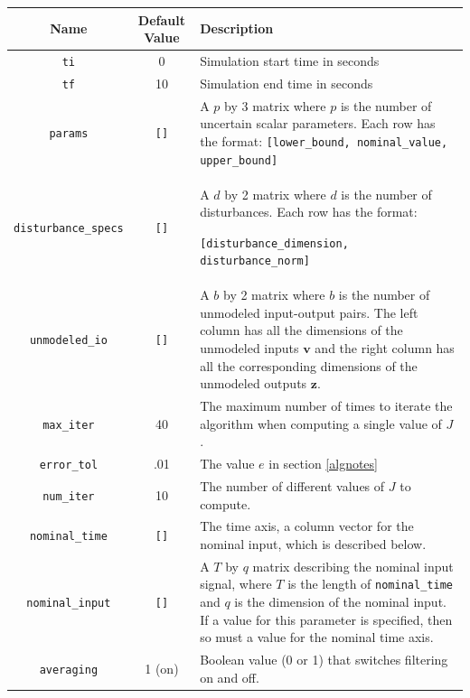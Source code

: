 \documentclass{article}
\begin{document}
\begin{table}[H]
\begin{center}
\begin{tabular}{| c | c | p{9cm} |}
\hline
\textbf{Name} & \textbf{Default Value} & \textbf{Description} \\
\hline
\texttt{ti} & 0 & Simulation start time in seconds \\
\hline 
\texttt{tf} & 10 & Simulation end time in seconds \\
\hline
\texttt{params} & \texttt{[]} & A $p$ by 3 matrix where $p$ is the number of
uncertain scalar parameters. Each row has the format:
\texttt{[lower\_bound, nominal\_value, upper\_bound]}\\
\hline
\texttt{disturbance\_specs} & \texttt{[]} & A $d$ by 2 matrix where $d$ is the
number of disturbances. Each row has the format:

\texttt{[disturbance\_dimension, disturbance\_norm]} \\
\hline
\texttt{unmodeled\_io} & \texttt{[]} & A $b$ by 2 matrix where $b$ is the number
of unmodeled input-output pairs. The left column has all the dimensions of the
unmodeled inputs $\mathbf{v}$ and the right column has all the corresponding
dimensions of the unmodeled outputs $\mathbf{z}$.\\
\hline
\texttt{max\_iter} & 40 & The maximum number of times to iterate the algorithm
when computing a single value of $J$.\\
\hline
\texttt{error\_tol} & .01 & The value $e$ in section \ref{algnotes} \\
\hline
\texttt{num\_iter} & 10 & The number of different values of $J$ to compute. \\
\hline
\texttt{nominal\_time} & \texttt{[]} & The time axis, a column vector for the
nominal input, which is described below. \\
\hline
\texttt{nominal\_input} & \texttt{[]} & A $T$ by $q$ matrix describing the
nominal input signal, where $T$ is the length of \texttt{nominal\_time} and $q$
is the dimension of the nominal input. If a value for this parameter is
specified, then so must a value for the nominal time axis. \\
\hline
\texttt{averaging} & 1 (on) & Boolean value (0 or 1) that switches filtering on
and off. \\
\hline
\end{tabular}
\label{inputparameters}
\end{center}
\end{table}
\end{document}
